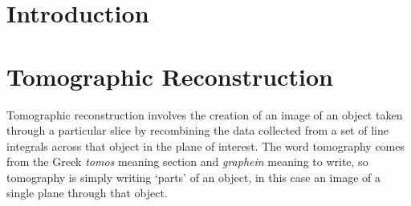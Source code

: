 
\section{Introduction} %
	\label{sec:introduction}


\section{Tomographic Reconstruction} %
	\label{sec:tomographic_reconstruction}
	Tomographic reconstruction involves the creation of an image of an object taken through a particular slice by recombining the data collected from a set of line integrals across that object in the plane of interest. The word tomography comes from the Greek \textit{tomos} meaning section and \textit{graphein} meaning to write, so tomography is simply writing `parts' of an object, in this case an image of a single plane through that object.

